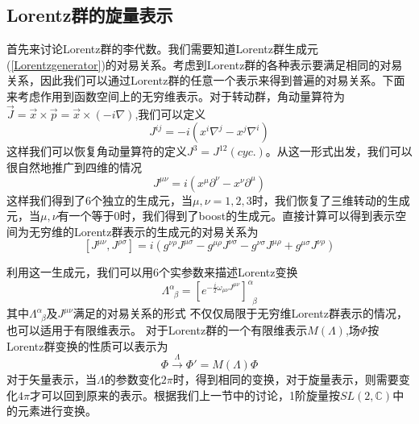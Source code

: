 \subsection{Lorentz群的旋量表示}
首先来讨论Lorentz群的李代数。我们需要知道Lorentz群生成元(\ref{Lorentzgenerator})的对易关系。考虑到Lorentz群的各种表示要满足相同的对易关系，因此我们可以通过Lorentz群的任意一个表示来得到普遍的对易关系。下面来考虑作用到函数空间上的无穷维表示。对于转动群，角动量算符为$\vec{J}=\vec{x}\times\vec{p}=\vec{x}\times(-i\nabla)$,我们可以定义
\begin{equation}
    J^{ij}=-i(x^{i}\nabla^{j}-x^{j}\nabla^{i})
\end{equation}
这样我们可以恢复角动量算符的定义$J^{3}=J^{12}(cyc.)$。从这一形式出发，我们可以很自然地推广到四维的情况
\begin{equation}
    J^{\mu\nu}=i(x^{\mu}\partial^{\nu}-x^{\nu}\partial^{\mu})
\end{equation}
这样我们得到了6个独立的生成元，当$\mu,\nu=1,2,3$时，我们恢复了三维转动的生成元，当$\mu,\nu$有一个等于0时，我们得到了boost的生成元。直接计算可以得到表示空间为无穷维的Lorentz群表示的生成元的对易关系为
\begin{equation}
\label{chap4commurela}
    \left[J^{\mu\nu},J^{\rho\sigma}\right]=i(g^{\nu\rho}J^{\mu\sigma}-g^{\mu\rho}J^{\nu\sigma}-g^{\nu\sigma}J^{\mu\rho}+g^{\mu\sigma}J^{\nu\rho})
\end{equation}

利用这一生成元，我们可以用6个实参数来描述Lorentz变换
\begin{equation}
    \Lambda^{\alpha}_{\;\;\beta}=\left[e^{-\frac{i}{2}\omega_{\mu\nu}J^{\mu\nu}}\right]^{\alpha}_{\;\;\beta}
\end{equation}
其中$\Lambda^{\alpha}_{\;\;\beta}$及$J^{\mu\nu}$满足的对易关系的形式 不仅仅局限于无穷维Lorentz群表示的情况，也可以适用于有限维表示。
对于Lorentz群的一个有限维表示$M(\Lambda)$,场$\Phi$按Lorentz群变换的性质可以表示为
\begin{equation}
    \Phi \xrightarrow{\Lambda} \Phi'=M(\Lambda)\Phi
\end{equation}
对于矢量表示，当$\Lambda$的参数变化$2\pi$时，得到相同的变换，对于旋量表示，则需要变化$4\pi$才可以回到原来的表示。根据我们上一节中的讨论，1阶旋量按$SL(2,\mathbb{C})$中的元素进行变换。

